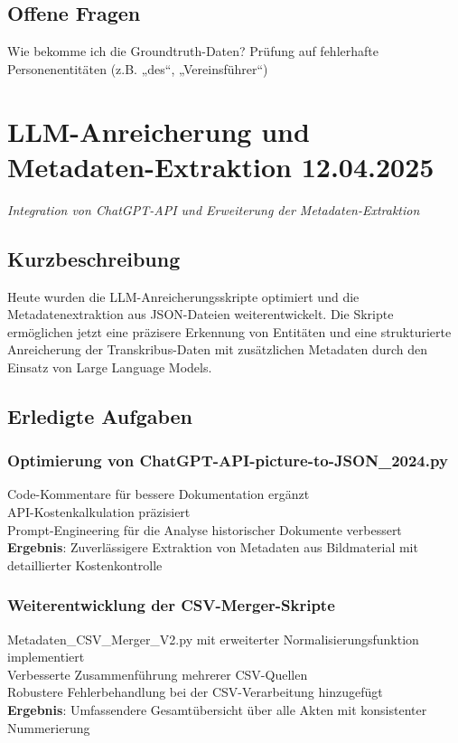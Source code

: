 \documentclass{article}
\begin{document}
\subsection*{Offene Fragen}
 Wie bekomme ich die Groundtruth-Daten?
 Prüfung auf fehlerhafte Personenentitäten (z.B. „des“, „Vereinsführer“)\\




\noindent\hrulefill

\section{LLM-Anreicherung und Metadaten-Extraktion \small 12.04.2025}
\small\textit{Integration von ChatGPT-API und Erweiterung der Metadaten-Extraktion}\\
\subsection*{Kurzbeschreibung}

Heute wurden die LLM-Anreicherungsskripte optimiert und die Metadatenextraktion aus JSON-Dateien weiterentwickelt. Die Skripte ermöglichen jetzt eine präzisere Erkennung von Entitäten und eine strukturierte Anreicherung der Transkribus-Daten mit zusätzlichen Metadaten durch den Einsatz von Large Language Models.

\subsection*{Erledigte Aufgaben}
\subsubsection*{\small Optimierung von ChatGPT-API-picture-to-JSON\_2024.py}
 Code-Kommentare für bessere Dokumentation ergänzt\\
 API-Kostenkalkulation präzisiert\\
 Prompt-Engineering für die Analyse historischer Dokumente verbessert\\
\textbf{Ergebnis}: Zuverlässigere Extraktion von Metadaten aus Bildmaterial mit detaillierter Kostenkontrolle

\subsubsection*{\small Weiterentwicklung der CSV-Merger-Skripte}
 Metadaten\_CSV\_Merger\_V2.py mit erweiterter Normalisierungsfunktion implementiert\\
 Verbesserte Zusammenführung mehrerer CSV-Quellen\\
 Robustere Fehlerbehandlung bei der CSV-Verarbeitung hinzugefügt\\
\textbf{Ergebnis}: Umfassendere Gesamtübersicht über alle Akten mit konsistenter Nummerierung
\end{document}
